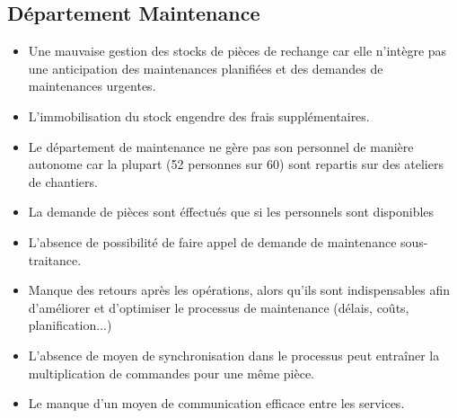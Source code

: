		\subsection{Département Maintenance}
				\begin{itemize}
						\item Une mauvaise gestion des stocks de pièces de rechange car elle n'intègre pas une anticipation des maintenances planifiées et des demandes de maintenances urgentes.
						\item L'immobilisation du stock engendre des frais supplémentaires.
						\item Le département de maintenance ne gère pas son personnel de manière autonome car la plupart (52 personnes sur 60) sont repartis sur des ateliers de chantiers.

						\item La demande de pièces sont éffectués que si les personnels sont disponibles

				
						\item L'absence de possibilité de faire appel de demande de maintenance sous-traitance.

						\item Manque  des retours après les opérations, alors qu’ils sont indispensables afin d’améliorer et d’optimiser le processus de maintenance (délais, coûts, planification...)

						\item L’absence de moyen de synchronisation dans le processus peut entraîner la multiplication de commandes pour une même pièce.
					
						\item Le manque d’un moyen de communication efficace entre les services.

				\end{itemize}
		
